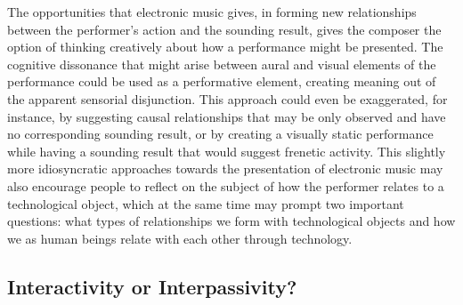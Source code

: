 The opportunities that electronic music gives, in forming new relationships between the performer's action and the sounding result, gives the composer the option of thinking creatively about how a performance might be presented. The cognitive dissonance that might arise between aural and visual elements of the performance could be used as a performative element, creating meaning out of the apparent sensorial disjunction. This approach could even be exaggerated, for instance, by suggesting causal relationships that may be only observed and have no corresponding sounding result, or by creating a visually static performance while having a sounding result that would suggest frenetic activity. This slightly more idiosyncratic approaches towards the presentation of electronic music may also encourage people to reflect on the subject of how the performer relates to a technological object, which at the same time may prompt two important questions: what types of relationships we form with technological objects and how we as human beings relate with each other through technology.
\hypertarget{interpassiv}{}

\subsection{Interactivity or Interpassivity?}
 
